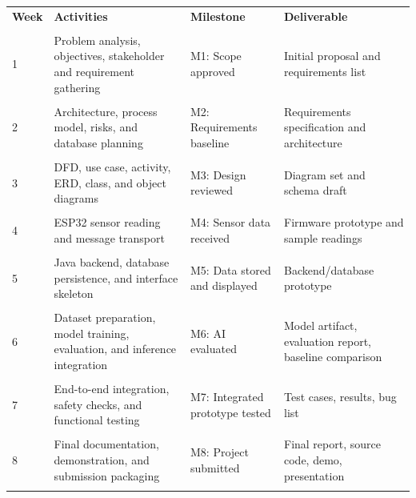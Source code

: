\documentclass[12pt,a4paper]{report}
\begin{document}
\begin{longtable}{p{}p{}p{}p{}}

\toprule

\textbf{Week} & \textbf{Activities} & \textbf{Milestone} & \textbf{Deliverable}\\\\

\midrule

1 & Problem analysis, objectives, stakeholder and requirement gathering & M1: Scope approved & Initial proposal and requirements list\\\\

2 & Architecture, process model, risks, and database planning & M2: Requirements baseline & Requirements specification and architecture\\\\

3 & DFD, use case, activity, ERD, class, and object diagrams & M3: Design reviewed & Diagram set and schema draft\\\\

4 & ESP32 sensor reading and message transport & M4: Sensor data received & Firmware prototype and sample readings\\\\

5 & Java backend, database persistence, and interface skeleton & M5: Data stored and displayed & Backend/database prototype\\\\

6 & Dataset preparation, model training, evaluation, and inference integration & M6: AI evaluated & Model artifact, evaluation report, baseline comparison\\\\

7 & End-to-end integration, safety checks, and functional testing & M7: Integrated prototype tested & Test cases, results, bug list\\\\

8 & Final documentation, demonstration, and submission packaging & M8: Project submitted & Final report, source code, demo, presentation\\\\

\bottomrule

\end{longtable}
\end{document}
